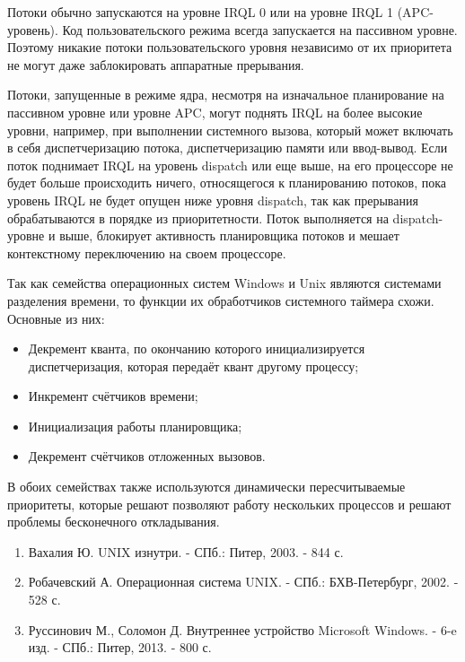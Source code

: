 Потоки обычно запускаются на уровне IRQL 0 или на уровне IRQL 1 (APC-уровень). Код пользовательского режима всегда запускается на пассивном уровне. Поэтому никакие потоки пользовательского уровня независимо от их приоритета не могут даже заблокировать аппаратные прерывания.

Потоки, запущенные в режиме ядра, несмотря на изначальное планирование на пассивном уровне или уровне APC, могут поднять IRQL на более высокие уровни, например, при выполнении системного вызова, который может включать в себя диспетчеризацию потока, диспетчеризацию памяти или ввод-вывод. Если поток поднимает IRQL на уровень dispatch или еще выше, на его процессоре не будет больше происходить ничего, относящегося к планированию потоков, пока уровень IRQL не будет опущен ниже уровня dispatch, так как прерывания обрабатываются в порядке из приоритетности. Поток выполняется на dispatch-уровне и выше, блокирует активность планировщика потоков и мешает контекстному переключению на своем процессоре.


\clearpage


Так как семейства операционных систем Windows и Unix являются системами разделения времени, то функции их обработчиков системного таймера схожи. Основные из них:

\begin{itemize}
	\item Декремент кванта, по окончанию которого инициализируется диспетчеризация, которая передаёт квант другому процессу;
	\item Инкремент счётчиков времени;
	\item Инициализация работы планировщика;
	\item Декремент счётчиков отложенных вызовов.
\end{itemize}

В обоих семействах также используются динамически пересчитываемые приоритеты, которые решают позволяют работу нескольких процессов и решают проблемы бесконечного откладывания.


\begin{enumerate}
	\item Вахалия Ю. UNIX изнутри. - СПб.: Питер, 2003. - 844 с.
	\item Робачевский А. Операционная система UNIX. - СПб.: БХВ-Петербург, 2002. - 528 с.
	\item Руссинович М., Соломон Д. Внутреннее устройство Microsoft Windows. - 6-e изд. - СПб.: Питер, 2013. - 800 с.
\end{enumerate}
